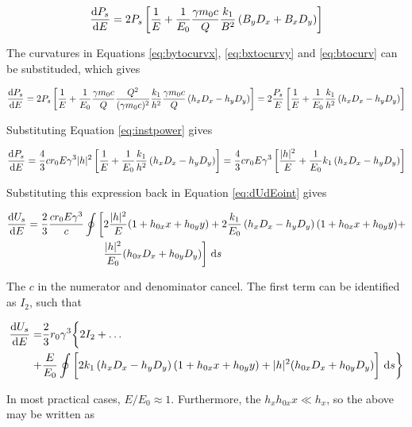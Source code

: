 \begin{equation}
    \frac{\text{d} {P_s}}{\text{d} {E}} = 2 P_s \left[ \frac{1}{E} + \frac{1}{E_0} \frac{\gamma m_0 c}{Q} \frac{k_1}{B^2} \left( B_y D_x + B_x D_y \right) \right]
\end{equation}

The curvatures in Equations \eqref{eq:bytocurvx}, \eqref{eq:bxtocurvy} and \eqref{eq:btocurv} can be substituded, which gives

\begin{equation}
    \frac{\text{d} {P_s}}{\text{d} {E}} = 2 P_s \left[ \frac{1}{E} + \frac{1}{E_0}\frac{\gamma m_0 c}{Q} \frac{Q^2}{(\gamma m_0 c)^2} \frac{k_1}{h^2} \frac{\gamma m_0 c}{Q} \left( h_x D_x - h_y D_y \right) \right] = 2 \frac{P_s}{E} \left[ \frac{1}{E} + \frac{1}{E_0} \frac{k_1}{h^2} \left( h_x D_x - h_y D_y \right) \right]
    \label{eq:dPdE}
\end{equation}

Substituting Equation \eqref{eq:instpower} gives

\begin{equation}
    \frac{\text{d} {P_s}}{\text{d} {E}} = \frac{4}{3} c r_0 E \gamma^3 |h|^2 \left[ \frac{1}{E} + \frac{1}{E_0} \frac{k_1}{h^2} \left( h_x D_x - h_y D_y \right) \right] = \frac{4}{3} c r_0 E \gamma^3  \left[ \frac{|h|^2}{E} + \frac{1}{E_0} k_1 \left( h_x D_x - h_y D_y \right) \right]
\end{equation}

Substituting this expression back in Equation \eqref{eq:dUdEoint} gives

\begin{align}
    \totder{U_s}{E} = \frac{2}{3} \frac{c r_0 E \gamma^3}{c} \oint \bigg[ &2\frac{|h|^2}{E}(1 + h_{0x}x + h_{0y}y) +
    2\frac{k_1}{E_0} \left( h_x D_x - h_y D_y \right)(1 + h_{0x}x + h_{0y}y) +\\ &\frac{|h|^2}{E_0} (h_{0x}D_x + h_{0y} D_y)\bigg] \ \dee s
\end{align}

The $c$ in the numerator and denominator cancel. The first term can be identified as $I_2$, such that

\begin{align}
    \totder{U_s}{E} = &\frac{2}{3} r_0 \gamma^3 \bigg\{ 2I_2 + \dots\\
    + &\frac{E}{E_0} \oint \bigg[2k_1 \left( h_x D_x - h_y D_y \right)(1 + h_{0x}x + h_{0y}y) + |h|^2 (h_{0x}D_x + h_{0y} D_y)\bigg] \ \dee s \bigg\}
\end{align}

In most practical cases, $E/E_0 \approx 1$. Furthermore, the $h_xh_{0x}x \ll h_x$, so the above may be written as

